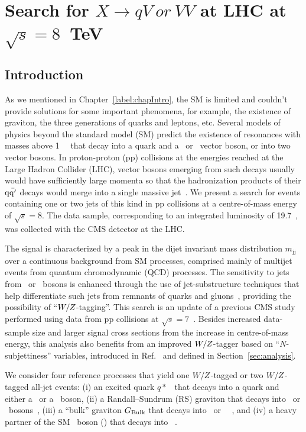 \chapter{Search for $X \to qV~or~VV$ at LHC at $\sqrt{s}=8$~TeV}
\section{Introduction}
\label{sec:introduction}

As we mentioned in Chapter~\ref{label:chapIntro}, the SM is limited and couldn't
provide solutions for some important phenomena, for example, the existence of 
graviton, the three generations of quarks and leptons, etc. 
Several models of physics beyond the standard model (SM) predict the
existence of resonances with masses above 1~\TeVcc~ that decay into a
quark and a \PW\ or \cPZ\ vector boson, or into two vector bosons. In
proton-proton (pp) collisions at the energies reached at the Large Hadron
Collider (LHC), vector bosons emerging from such decays usually would have
sufficiently large momenta so that the hadronization products of their
${\rm q\bar{q'}}$ decays would merge into a single massive
jet~\cite{Gouzevitch:2013qca}. We present a search for events
containing one or two jets of this kind in pp collisions at a
centre-of-mass energy of $\sqrt{s}=8$\TeVcc.  The data sample,
corresponding to an integrated luminosity of 19.7~\fbinv, was collected
with the CMS detector at the LHC.

The signal is characterized by a peak in the dijet invariant mass
distribution $m_\mathrm{jj}$ over a continuous background from SM
processes, comprised mainly of multijet events from quantum
chromodynamic (QCD) processes. The sensitivity to jets from \PW\ or
\cPZ\ bosons is enhanced through the use of jet-substructure
techniques that help differentiate such jets from remnants of quarks
and gluons~\cite{topwtag_pas,JME-13-006}, providing the possibility of
``$W/Z$-tagging''. This search is an update of a previous CMS
study~\cite{ref_2011} performed using data from pp collisions at
$\sqrt{s}=7$~\TeVcc. Besides increased data-sample size and larger
signal cross sections from the increase in centre-of-mass energy, this
analysis also benefits from an improved $W/Z$-tagger based on
``$N$-subjettiness'' variables, introduced in
Ref.~\cite{Thaler:2010tr} and defined in Section~\ref{sec:analysis}.

We consider four reference processes that yield one $W/Z$-tagged
or two $W/Z$-tagged all-jet events: (i) an excited quark
$q*$~\cite{ref_qstar, ref_qstar2} that decays into a quark and
either a \PW\ or a \cPZ\ boson, (ii) a Randall--Sundrum (RS) graviton
\GRS that decays into \PW \PW\ or \cPZ \cPZ\
bosons~\cite{rs1,Randall:1999vf}, (iii) a ``bulk'' graviton $G_\mathrm{Bulk}$
that decays into \PW \PW\ or \cPZ \cPZ\
~\cite{GravitonWWZZ1,GravitonWWZZ2,GravitonWWZZ3}, and (iv) a
heavy partner of the SM \PW\ boson (\PWpr) that decays into \PW\cPZ\
\cite{egm}.


